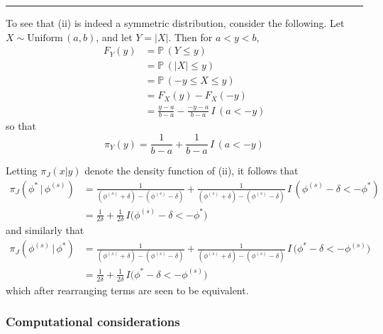 \documentclass[11pt]{article}
\newcommand{\prob}{\mathbb{P}\,}
\newcommand{\barS}{\,|\,}
\newcommand{\ind}{I}
\begin{document}
\vspace{4mm} \begin{center} \rule{1.0\textwidth}{0.25mm} \end{center} \vspace{4mm}
\noindent To see that (ii) is indeed a symmetric distribution, consider the following.  Let $X \sim \text{Uniform}\, (a,b)$, and let $Y = |X|$.  Then for $a < y < b$,
\begin{align*}
F_Y(y) &= \prob(Y \leq y) \\[1ex]
&= \prob(|X| \leq y) \\[1ex]
&= \prob(-y \leq X \leq y) \\[1ex]
&= F_X(y) - F_X(-y) \\[1ex]
&= \frac{ y-a }{ b-a } - \frac{ -y-a }{ b-a }\, \ind\,(a < -y)
\end{align*}
so that
\[ \pi_Y(y) = \frac{ 1 }{ b-a } + \frac{ 1 }{ b - a }\, \ind\,(a < -y)  \] \vspace{4mm}

\noindent Letting $\pi_J \left( x | y \right)$ denote the density function of (ii), it follows that 
\begin{align*}
\pi_J \left( \phi^* \barS \phi^{(s)} \right) &= \frac{ 1 }{ (\phi^{(s)} + \delta) - (\phi^{(s)} - \delta) } + \frac{ 1 }{ (\phi^{(s)} + \delta) - (\phi^{(s)} - \delta) }\, \ind\,(\phi^{(s)} - \delta < -\phi^*)  \\[1ex]
&= \frac{ 1 }{ 2\delta } + \frac{ 1 }{ 2\delta }\, \ind\big(\phi^{(s)} - \delta < -\phi^{*}\big)
\end{align*}
and similarly that
\begin{align*} \pi_J \left( \phi^{(s)} \barS \phi^{*} \right) &= \frac{ 1 }{ (\phi^{(s)} + \delta) - (\phi^{(s)} - \delta) } + \frac{ 1 }{ (\phi^{(s)} + \delta) - (\phi^{(s)} - \delta) }\, \ind\,(\phi^{*} - \delta < -\phi^{(s)}\big) \\[1ex]
&= \frac{ 1 }{ 2\delta } + \frac{ 1 }{ 2\delta }\, \ind\big(\phi^{*} - \delta < -\phi^{(s)}\big)
\end{align*}
which after rearranging terms are seen to be equivalent.





\subsubsection{Computational considerations}
\end{document}
